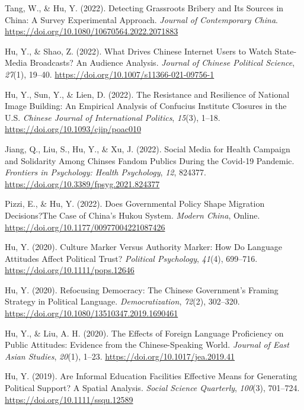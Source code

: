 \documentclass[11pt,a4paper,]{awesome-cv}
\begin{document}
\leavevmode{}%
Tang, W., \& Hu, Y. (2022). Detecting Grassroots Bribery and Its Sources
in China: A Survey Experimental Approach. \emph{Journal of Contemporary
China}. \url{https://doi.org/10.1080/10670564.2022.2071883}

\leavevmode{}%
Hu, Y., \& Shao, Z. (2022). What Drives Chinese Internet Users to Watch
State-Media Broadcasts? An Audience Analysis. \emph{Journal of Chinese
Political Science}, \emph{27}(1), 19--40.
\url{https://doi.org/10.1007/s11366-021-09756-1}

\leavevmode{}%
Hu, Y., Sun, Y., \& Lien, D. (2022). The Resistance and Resilience of
National Image Building: An Empirical Analysis of Confucius Institute
Closures in the U.S. \emph{Chinese Journal of International Politics},
\emph{15}(3), 1--18. \url{https://doi.org/10.1093/cjip/poac010}

\leavevmode{}%
Jiang, Q., Liu, S., Hu, Y., \& Xu, J. (2022). Social Media for Health
Campaign and Solidarity Among Chinses Fandom Publics During the Covid-19
Pandemic. \emph{Frontiers in Psychology: Health Psychology}, \emph{12},
824377. \url{https://doi.org/10.3389/fpsyg.2021.824377}

\leavevmode{}%
Pizzi, E., \& Hu, Y. (2022). Does Governmental Policy Shape Migration
Decisions?The Case of China's Hukou System. \emph{Modern China}, Online.
\url{https://doi.org/10.1177/00977004221087426}

\leavevmode{}%
Hu, Y. (2020). Culture Marker Versus Authority Marker: How Do Language
Attitudes Affect Political Trust? \emph{Political Psychology},
\emph{41}(4), 699--716. \url{https://doi.org/10.1111/pops.12646}

\leavevmode{}%
Hu, Y. (2020). Refocusing Democracy: The Chinese Government's Framing
Strategy in Political Language. \emph{Democratization}, \emph{72}(2),
302--320. \url{https://doi.org/10.1080/13510347.2019.1690461}

\leavevmode{}%
Hu, Y., \& Liu, A. H. (2020). The Effects of Foreign Language
Proficiency on Public Attitudes: Evidence from the Chinese-Speaking
World. \emph{Journal of East Asian Studies}, \emph{20}(1), 1--23.
\url{https://doi.org/10.1017/jea.2019.41}

\leavevmode{}%
Hu, Y. (2019). Are Informal Education Facilities Effective Means for
Generating Political Support? A Spatial Analysis. \emph{Social Science
Quarterly}, \emph{100}(3), 701--724.
\url{https://doi.org/10.1111/ssqu.12589}
\end{document}
